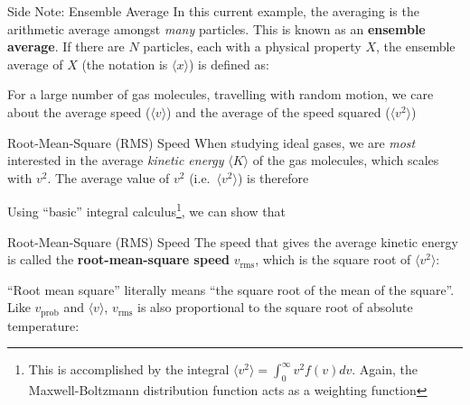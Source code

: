 \documentclass[12pt,aspectratio=169,dvipsnames]{beamer}
\begin{document}
\begin{frame}{Side Note: Ensemble Average}
  In this current example, the averaging is the arithmetic average amongst
  \emph{many} particles. This is known as an \textbf{ensemble average}. If
  there are $N$ particles, each with a physical property $X$, the ensemble
  average of $X$ (the notation is $\langle x\rangle$) is defined as:


  For a large number of gas molecules, travelling with random motion, we
  care about the average speed ($\langle v\rangle$) and the average of the
  speed squared ($\langle v^2\rangle$)
\end{frame}




\begin{frame}{Root-Mean-Square (RMS) Speed}
  When studying ideal gases, we are \emph{most} interested in the average
  \emph{kinetic energy} $\langle K\rangle$ of the gas molecules, which scales
  with $v^2$. The average value of $v^2$ (i.e.\ $\langle v^2\rangle$) is
  therefore

  
  Using ``basic'' integral calculus\footnote{This is accomplished by the
  integral $\langle v^2\rangle=\int_0^\infty v^2f(v)dv$. Again, the
  Maxwell-Boltzmann distribution function acts as a weighting function}, we can
  show that

\end{frame}



\begin{frame}{Root-Mean-Square (RMS) Speed}
  The speed that gives the average kinetic energy is called the
  \textbf{root-mean-square speed} $v_\text{rms}$, which is the square root of
  $\langle v^2\rangle$:


  ``Root mean square'' literally means ``the square root of the mean of the
  square''. Like $v_\text{prob}$ and $\langle v\rangle$, $v_\text{rms}$ is
  also proportional to the square root of absolute temperature:

\end{frame}
\end{document}
